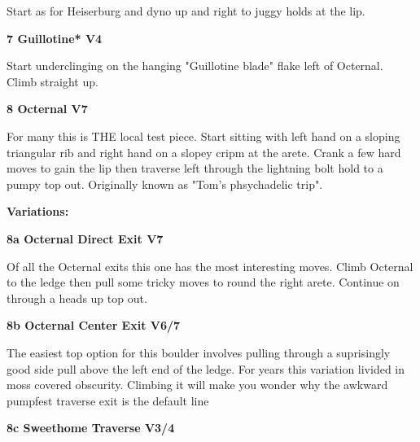 \begin{multicols}{2}
\begin{adjustwidth}{0.5cm}{}
					\begin{adjustwidth}{0.5cm}{}				
					Start as for Heiserburg and dyno up and right to juggy holds at the lip.
					\end{adjustwidth}
				\end{adjustwidth}
			\label{rt:Guillotine}
\colorbox{RoyalBlue!20}{
\parbox{0.95\linewidth}{
\textbf{
7 Guillotine* V4  
}
}
}

			\begin{adjustwidth}{0.5cm}{}				
			Start underclinging on the hanging "Guillotine blade" flake left of Octernal. Climb straight up.
			\end{adjustwidth}
			\label{rt:Octernal}
\colorbox{Goldenrod!50}{
\parbox{0.95\linewidth}{
\textbf{
8 Octernal V7  
}
}
}

			\begin{adjustwidth}{0.5cm}{}				
			For many this is THE local test piece. Start sitting with left hand on a sloping triangular rib and right hand on a slopey cripm at the arete. Crank a few hard moves to gain the lip then traverse left through the lightning bolt hold to a pumpy top out. Originally known as "Tom's phsychadelic trip".
			\end{adjustwidth}
				\begin{adjustwidth}{0.5cm}{}				
				\textbf{Variations:} \newline
					\label{vr:Octernal Direct Exit}
\colorbox{Goldenrod!50}{
\parbox{0.95\linewidth}{
\textbf{
8a Octernal Direct Exit V7  
}
}
}

					\begin{adjustwidth}{0.5cm}{}				
					Of all the Octernal exits this one has the most interesting moves. Climb Octernal to the ledge then pull some tricky moves to round the right arete. Continue on through a heads up top out.
					\end{adjustwidth}
					\label{vr:Octernal Center Exit}
\colorbox{Goldenrod!50}{
\parbox{0.95\linewidth}{
\textbf{
8b Octernal Center Exit V6/7  
}
}
}

					\begin{adjustwidth}{0.5cm}{}				
					The easiest top option for this boulder involves pulling through a suprisingly good side pull above the left end of the ledge. For years this variation livided in moss covered obscurity. Climbing it will make you wonder why the awkward pumpfest traverse exit is the default line
					\end{adjustwidth}
					\label{vr:Sweethome Traverse}
\colorbox{RoyalBlue!20}{
\parbox{0.95\linewidth}{
\textbf{
8c Sweethome Traverse V3/4  
}
}
}


\end{adjustwidth}
\end{multicols}

